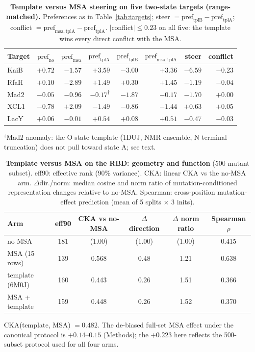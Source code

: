 \documentclass[11pt]{article}
\newcommand{\pref}{\mathrm{pref}}
\begin{document}
\begin{table}[t]
\centering
\caption{\textbf{Template versus MSA steering on five two-state targets
(range-matched).} Preferences as in Table~\ref{tab:targets};
steer $= \pref_{\mathrm{tplB}} - \pref_{\mathrm{tplA}}$;
conflict $= \pref_{\mathrm{msa,tplA}} - \pref_{\mathrm{tplA}}$.
$|$conflict$| \le 0.23$ on all five: the template wins every direct
conflict with the MSA.}
\label{tab:e49}
\small
\begin{tabular}{lrrrrrrr}
\toprule
Target & $\pref_{\mathrm{no}}$ & $\pref_{\mathrm{msa}}$ &
$\pref_{\mathrm{tplA}}$ & $\pref_{\mathrm{tplB}}$ &
$\pref_{\mathrm{msa,tplA}}$ & steer & conflict \\
\midrule
KaiB & $+0.72$ & $-1.57$ & $+3.59$ & $-3.00$ & $+3.36$ & $-6.59$ & $-0.23$ \\
RfaH & $+0.10$ & $-2.89$ & $+1.49$ & $+0.30$ & $+1.45$ & $-1.19$ & $-0.04$ \\
Mad2 & $-0.05$ & $-0.96$ & $-0.17^{\dagger}$ & $-1.87$ & $-0.17$ & $-1.70$ & $+0.00$ \\
XCL1 & $-0.78$ & $+2.09$ & $-1.49$ & $-0.86$ & $-1.44$ & $+0.63$ & $+0.05$ \\
LacY & $+0.06$ & $-0.01$ & $+0.54$ & $+0.08$ & $+0.51$ & $-0.47$ & $-0.03$ \\
\bottomrule
\end{tabular}
\begin{flushleft}\footnotesize
$^{\dagger}$Mad2 anomaly: the O-state template (1DUJ, NMR ensemble,
N-terminal truncation) does not pull toward state A; see text.
\end{flushleft}
\end{table}

\begin{table}[t]
\centering
\caption{\textbf{Template versus MSA on the RBD: geometry and function}
(500-mutant subset). eff90: effective rank (90\% variance). CKA: linear CKA
vs the no-MSA arm. $\Delta$dir./norm: median cosine and norm ratio of
mutation-conditioned representation changes relative to no-MSA. Spearman:
cross-position mutation-effect prediction (mean of 5 splits $\times$ 3
inits).}
\label{tab:rbd}
\small
\begin{tabular}{lccccc}
\toprule
Arm & eff90 & CKA vs no-MSA & $\Delta$ direction & $\Delta$ norm ratio & Spearman $\rho$ \\
\midrule
no MSA & 181 & (1.00) & (1.00) & (1.00) & 0.415 \\
MSA (15 rows) & 139 & 0.568 & 0.48 & 1.21 & 0.638 \\
template (6M0J) & 160 & 0.443 & 0.26 & 1.51 & 0.366 \\
MSA + template & 159 & 0.448 & 0.26 & 1.52 & 0.370 \\
\bottomrule
\end{tabular}
\begin{flushleft}\footnotesize
CKA(template, MSA) $= 0.482$. The de-biased full-set MSA effect under the
canonical protocol is $+0.14$--$0.15$ (Methods); the $+0.223$ here reflects
the 500-subset protocol used for all four arms.
\end{flushleft}
\end{table}
\end{document}
